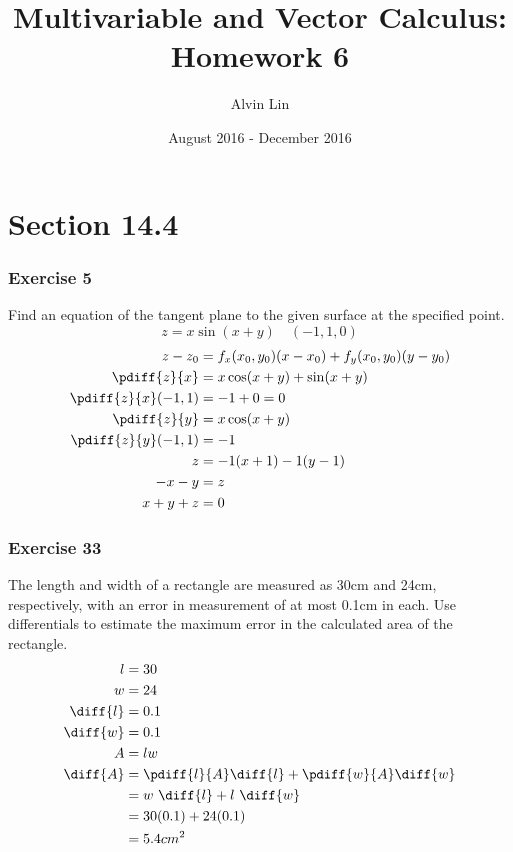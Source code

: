 \documentclass[letterpaper, 12pt]{math}
\title{Multivariable and Vector Calculus: Homework 6}
\author{Alvin Lin}
\date{August 2016 - December 2016}
\begin{document}
\maketitle

\section*{Section 14.4}

\subsubsection*{Exercise 5}
Find an equation of the tangent plane to the given surface at the specified
point.
\[ z = x\sin(x+y) \quad (-1,1,0) \]
\begin{align*}
  z-z_0 &= f_x(x_0,y_0)(x-x_0)+f_y(x_0,y_0)(y-y_0) \\
  \pdiff{z}{x} &= x\cos(x+y)+\sin(x+y) \\
  \pdiff{z}{x}(-1,1) &= -1+0 = 0 \\
  \pdiff{z}{y} &= x\cos(x+y) \\
  \pdiff{z}{y}(-1,1) &= -1 \\
  z &= -1(x+1)-1(y-1) \\
  -x-y &= z \\
  x+y+z &= 0
\end{align*}

\subsubsection*{Exercise 33}
The length and width of a rectangle are measured as 30cm and 24cm, respectively,
with an error in measurement of at most 0.1cm in each. Use differentials to
estimate the maximum error in the calculated area of the rectangle.
\begin{align*}
  l &= 30 \\
  w &= 24 \\
  \diff{l} &= 0.1 \\
  \diff{w} &= 0.1 \\
  A &= lw \\
  \diff{A} &= \pdiff{l}{A}\diff{l}+\pdiff{w}{A}\diff{w} \\
  &= w~\diff{l}+l~\diff{w} \\
  &= 30(0.1)+24(0.1) \\
  &= 5.4cm^2
\end{align*}
\end{document}
